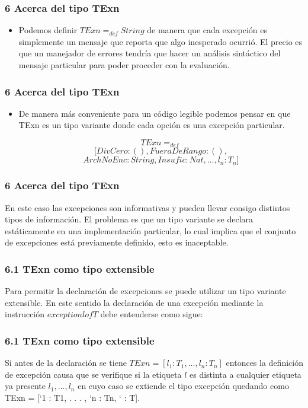 \documentclass[xcolor=dvipsnames,table,spanish]{beamer}
\begin{document}
\begin{frame}
\frametitle{6 Acerca del tipo TExn}
\begin{itemize}
\item Podemos definir $TExn =_{def} String$ de manera que cada excepción es simplemente un mensaje que reporta que algo inesperado ocurrió. El precio es que un manejador de errores tendría que hacer un análisis sintáctico del mensaje particular para poder proceder con la evaluación.

\end{itemize}
\end{frame}

\begin{frame}
\frametitle{6 Acerca del tipo TExn}
\begin{itemize}

\item De manera más conveniente para un código legible podemos pensar en que TExn es un tipo variante donde cada opción es una excepción particular.

\begin{example}
\[TExn =_{def}\] \[[DivCero:(),FueraDeRango:(),\]\[ArchNoEnc:String,Insufic:Nat,...,l_n:T_n]\]
\end{example}
\end{itemize}
\end{frame}

\begin{frame}
\frametitle{6 Acerca del tipo TExn}
En este caso las excepciones son informativas y pueden llevar consigo distintos tipos de información. El problema es que un tipo variante se declara estáticamente en una implementación particular, lo cual implica que el conjunto de excepciones está previamente definido, esto es inaceptable.

\end{frame}

\begin{frame}
\frametitle{6.1 TExn como tipo extensible}
Para permitir la declaración de excepciones se puede utilizar un tipo variante extensible.\newline
En este sentido la declaración de una excepción mediante la instrucción $exception l of T$ debe entenderse como sigue:
\end{frame}

\begin{frame}
\frametitle{6.1 TExn como tipo extensible}
Si antes de la declaración se tiene $TExn = [l_1 : T_1, . . . , l_n : T_n]$ entonces la definición de excepción causa que se verifique si la etiqueta
$l$ es distinta a cualquier etiqueta ya presente $l_1, . . . , l_n$ en cuyo caso se extiende el tipo excepción quedando como TExn = [`1 : T1, . . . , `n : Tn, ` : T].
\end{frame}
\end{document}
